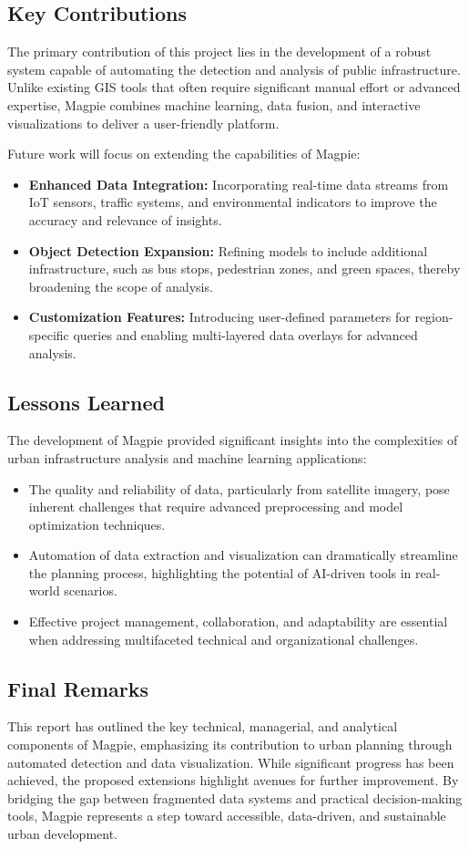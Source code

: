 \subsection{Key Contributions}
The primary contribution of this project lies in the development of a robust
system capable of automating the detection and analysis of public
infrastructure. Unlike existing GIS tools that often require significant manual
effort or advanced expertise, Magpie combines machine learning, data fusion, and
interactive visualizations to deliver a user-friendly platform.

Future work will focus on extending the capabilities of Magpie:
\begin{itemize}
    \item \textbf{Enhanced Data Integration:} Incorporating real-time data
    streams from IoT sensors, traffic systems, and environmental indicators to
    improve the accuracy and relevance of insights.
    \item \textbf{Object Detection Expansion:} Refining models to include
    additional infrastructure, such as bus stops, pedestrian zones, and green
    spaces, thereby broadening the scope of analysis.
    \item \textbf{Customization Features:} Introducing user-defined parameters
    for region-specific queries and enabling multi-layered data overlays for
    advanced analysis.
\end{itemize}

\subsection{Lessons Learned}
The development of Magpie provided significant insights into the complexities of
urban infrastructure analysis and machine learning applications:
\begin{itemize}
    \item The quality and reliability of data, particularly from satellite
    imagery, pose inherent challenges that require advanced preprocessing and
    model optimization techniques.
    \item Automation of data extraction and visualization can dramatically
    streamline the planning process, highlighting the potential of AI-driven
    tools in real-world scenarios.
    \item Effective project management, collaboration, and adaptability are
    essential when addressing multifaceted technical and organizational
    challenges.
\end{itemize}

\subsection*{Final Remarks}
This report has outlined the key technical, managerial, and analytical
components of Magpie, emphasizing its contribution to urban planning through
automated detection and data visualization. While significant progress has been
achieved, the proposed extensions highlight avenues for further improvement. By
bridging the gap between fragmented data systems and practical decision-making
tools, Magpie represents a step toward accessible, data-driven, and sustainable
urban development.

\newpage{}